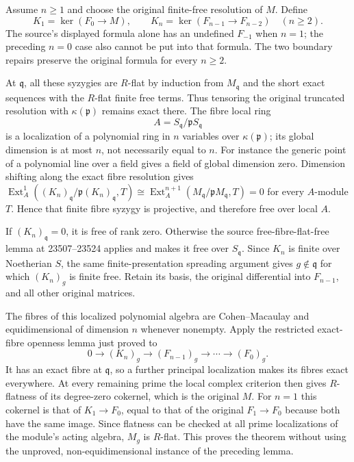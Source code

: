 Assume \(n\geq1\) and choose the original finite-free resolution of \(M\). Define \[
K_1=\ker(F_0\to M),\qquad
K_n=\ker(F_{n-1}\to F_{n-2})\quad(n\geq2).
\] The source's displayed formula alone has an undefined \(F_{-1}\) when \(n=1\); the preceding \(n=0\) case also cannot be put into that formula. The two boundary repairs preserve the original formula for every \(n\geq2\).

At \(\mathfrak q\), all these syzygies are \(R\)-flat by induction from \(M_{\mathfrak q}\) and the short exact sequences with the \(R\)-flat finite free terms. Thus tensoring the original truncated resolution with \(\kappa(\mathfrak p)\) remains exact there. The fibre local ring \[
A=S_{\mathfrak q}/\mathfrak pS_{\mathfrak q}
\] is a localization of a polynomial ring in \(n\) variables over \(\kappa(\mathfrak p)\); its global dimension is at most \(n\), not necessarily equal to \(n\). For instance the generic point of a polynomial line over a field gives a field of global dimension zero. Dimension shifting along the exact fibre resolution gives \(\operatorname{Ext}_A^1((K_n)_{\mathfrak q}/\mathfrak p(K_n)_{\mathfrak q},T)
\cong\operatorname{Ext}_A^{n+1}(M_{\mathfrak q}/\mathfrak pM_{\mathfrak q},T)=0\) for every \(A\)-module \(T\). Hence that finite fibre syzygy is projective, and therefore free over local \(A\).

If \((K_n)_{\mathfrak q}=0\), it is free of rank zero. Otherwise the source free-fibre-flat-free lemma at 23507--23524 applies and makes it free over \(S_{\mathfrak q}\). Since \(K_n\) is finite over Noetherian \(S\), the same finite-presentation spreading argument gives \(g\notin\mathfrak q\) for which \((K_n)_g\) is finite free. Retain its basis, the original differential into \(F_{n-1}\), and all other original matrices.

The fibres of this localized polynomial algebra are Cohen--Macaulay and equidimensional of dimension \(n\) whenever nonempty. Apply the restricted exact-fibre openness lemma just proved to \[
0\longrightarrow (K_n)_g\longrightarrow (F_{n-1})_g
\longrightarrow\cdots\longrightarrow(F_0)_g.
\] It has an exact fibre at \(\mathfrak q\), so a further principal localization makes its fibres exact everywhere. At every remaining prime the local complex criterion then gives \(R\)-flatness of its degree-zero cokernel, which is the original \(M\). For \(n=1\) this cokernel is that of \(K_1\to F_0\), equal to that of the original \(F_1\to F_0\) because both have the same image. Since flatness can be checked at all prime localizations of the module's acting algebra, \(M_g\) is \(R\)-flat. This proves the theorem without using the unproved, non-equidimensional instance of the preceding lemma.

